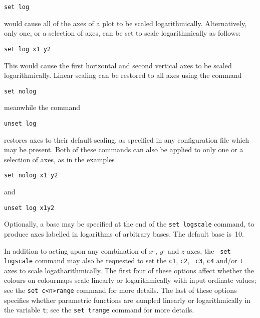 \begin{verbatim}
set log
\end{verbatim}

\noindent would cause all of the axes of a plot to be scaled logarithmically.
Alternatively, only one, or a selection of axes, can be set to scale
logarithmically as follows:

\begin{verbatim}
set log x1 y2
\end{verbatim}

\noindent This would cause the first horizontal and second vertical axes to be
scaled logarithmically.  Linear scaling can be restored to all axes using the
command

\begin{verbatim}
set nolog
\end{verbatim}

\noindent meanwhile the command

\begin{verbatim}
unset log
\end{verbatim}

\noindent restores axes to their default scaling, as specified in any
configuration file which may be present. Both of these commands can also be
applied to only one or a selection of axes, as in the examples

\begin{verbatim}
set nolog x1 y2
\end{verbatim}

\noindent and

\begin{verbatim}
unset log x1y2
\end{verbatim}

Optionally, a base may be specified at the end of the {\tt set logscale}
command, to produce axes labelled in logarithms of arbitrary bases.  The
default base is~10.

In addition to acting upon any combination of $x$-, $y$- and $z$-axes, the {\tt
set logscale} command may also be requested to set the {\tt c1}, {\tt c2}, {\tt
c3}, {\tt c4} and/or {\tt t} axes to scale logatharithmically. The first four
of these options affect whether the colours on colourmaps scale linearly or
logarithmically with input ordinate values; see the {\tt set c<n>range} command
for more details. The last of these options specifies whether parametric
functions are sampled linearly or logarithmically in the variable {\tt t}; see
the {\tt set trange} command for more details.


